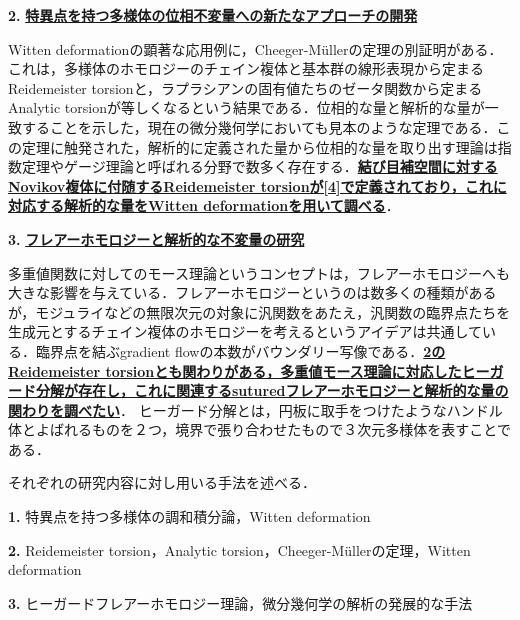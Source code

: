 \documentclass[11pt,a4j,dvipdfmx]{jarticle} 					%
\newcommand{\研究課題名}{象の卵}
\newcommand{\研究機関名}{京都大学}
\newcommand{\研究代表者氏名}{福士謙二}
\begin{document}
\noindent
\begin{screen}
\textbf{2. } \textbf{\ul{特異点を持つ多様体の位相不変量への新たなアプローチの開発}}


Witten deformationの顕著な応用例に，Cheeger-M\"{u}llerの定理の別証明がある．これは，多様体のホモロジーのチェイン複体と基本群の線形表現から定まるReidemeister torsionと，ラプラシアンの固有値たちのゼータ関数から定まるAnalytic torsionが等しくなるという結果である．位相的な量と解析的な量が一致することを示した，現在の微分幾何学においても見本のような定理である．この定理に触発された，解析的に定義された量から位相的な量を取り出す理論は指数定理やゲージ理論と呼ばれる分野で数多く存在する．\textbf{\ul{結び目補空間に対するNovikov複体に付随するReidemeister torsionが[4]で定義されており，これに対応する解析的な量をWitten deformationを用いて調べる}}．



\end{screen}

\noindent
\begin{screen}
\textbf{3. } \textbf{\ul{フレアーホモロジーと解析的な不変量の研究}}

多重値関数に対してのモース理論というコンセプトは，フレアーホモロジーへも大きな影響を与えている．フレアーホモロジーというのは数多くの種類があるが，モジュライなどの無限次元の対象に汎関数をあたえ，汎関数の臨界点たちを生成元とするチェイン複体のホモロジーを考えるというアイデアは共通している．臨界点を結ぶgradient flowの本数がバウンダリー写像である．\textbf{\ul{2のReidemeister torsionとも関わりがある，多重値モース理論に対応したヒーガード分解が存在し，これに関連するsuturedフレアーホモロジーと解析的な量の関わりを調べたい}}．
ヒーガード分解とは，円板に取手をつけたようなハンドル体とよばれるものを２つ，境界で張り合わせたもので３次元多様体を表すことである．



\end{screen}


\noindent
{}
\noindent

それぞれの研究内容に対し用いる手法を述べる．

\noindent
\textbf{1. }特異点を持つ多様体の調和積分論，Witten deformation

\noindent
\textbf{2. }Reidemeister torsion，Analytic torsion，Cheeger-M\"{u}llerの定理，Witten deformation

\noindent
\textbf{3. }ヒーガードフレアーホモロジー理論，微分幾何学の解析の発展的な手法


\noindent
{}
\end{document}
